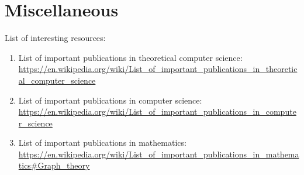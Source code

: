 









\chapter{Miscellaneous}
\label{chp:Miscellaneous}

List of interesting resources: \vspace{-0.3cm}
\begin{enumerate} \itemsep -4pt
\item List of important publications in theoretical computer science: \url{https://en.wikipedia.org/wiki/List_of_important_publications_in_theoretical_computer_science}
\item List of important publications in computer science: \url{https://en.wikipedia.org/wiki/List_of_important_publications_in_computer_science}
\item List of important publications in mathematics: \url{https://en.wikipedia.org/wiki/List_of_important_publications_in_mathematics#Graph_theory}
\end{enumerate}


